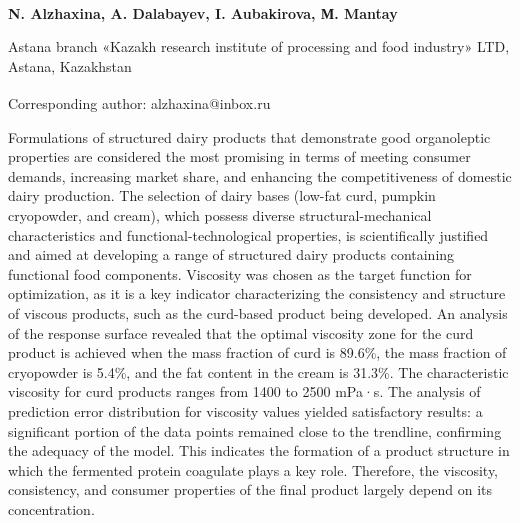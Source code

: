 \vspace{0.5em}
\begin{articleheader}

{\bfseries
N. Alzhaxina\textsuperscript{\envelope },
A. Dalabayev,
I. Aubakirova,
М. Mantay
}
\end{articleheader}

\begin{affiliation}
Astana branch «Kazakh research institute of processing and food industry» LTD, Astana, Kazakhstan

\raggedright \textsuperscript{\envelope }Corresponding author: alzhaxina@inbox.ru
\end{affiliation}

Formulations of structured dairy products that demonstrate good
organoleptic properties are considered the most promising in terms of
meeting consumer demands, increasing market share, and enhancing the
competitiveness of domestic dairy production. The selection of dairy
bases (low-fat curd, pumpkin cryopowder, and cream), which possess
diverse structural-mechanical characteristics and
functional-tech\-nological properties, is scientifically justified and
aimed at developing a range of structured dairy products containing
functional food components. Viscosity was chosen as the target function
for optimization, as it is a key indicator characterizing the
consistency and structure of viscous products, such as the curd-based
product being developed. An analysis of the response surface revealed
that the optimal viscosity zone for the curd product is achieved when
the mass fraction of curd is 89.6\%, the mass fraction of cryopowder is
5.4\%, and the fat content in the cream is 31.3\%. The characteristic
viscosity for curd products ranges from 1400 to 2500 mPa·s. The analysis
of prediction error distribution for viscosity values yielded
satisfactory results: a significant portion of the data points remained
close to the trendline, confirming the adequacy of the model. This
indicates the formation of a product structure in which the fermented
protein coagulate plays a key role. Therefore, the viscosity,
consistency, and consumer properties of the final product largely depend
on its concentration.

